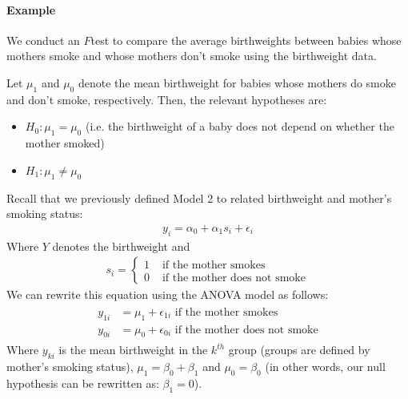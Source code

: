 \documentclass[letterpaper,10pt,english]{jupyterBook}
\begin{document}
\paragraph{Example}
\label{\detokenize{14.g. Linear Regression III:id4}}
\sphinxAtStartPar
We conduct an \(F\)\sphinxhyphen{}test to compare the average birthweights between babies whose mothers smoke and whose mothers don’t smoke using the birthweight data.

\sphinxAtStartPar
Let \(\mu_1\) and \(\mu_0\) denote the mean birthweight for babies whose mothers do smoke and don’t smoke, respectively. Then, the relevant hypotheses are:
\begin{itemize}
\item {} 
\sphinxAtStartPar
\(H_0: \mu_1= \mu_0\) (i.e. the birthweight of a baby does not depend on whether the mother smoked)

\item {} 
\sphinxAtStartPar
\(H_1: \mu_1\neq \mu_0\)

\end{itemize}

\sphinxAtStartPar
Recall that we previously defined Model 2 to related birthweight and mother’s smoking status:
\begin{equation*}
\begin{split} 
y_i = \alpha_0 + \alpha_1 s_i + \epsilon_i
\end{split}
\end{equation*}
\sphinxAtStartPar
Where \(Y\) denotes the birthweight and
\begin{equation*}
\begin{split} 
s_{i} =
\begin{cases}
    1 & \text{ if the mother smokes} \\
    0 & \text{ if the mother does not smoke}
\end{cases} 
\end{split}
\end{equation*}
\sphinxAtStartPar
We can rewrite this equation using the ANOVA model as follows:
\begin{equation*}
\begin{split}
\begin{align}
    y_{1i} &=\mu_1 + \epsilon_{1i}  \text{ if the mother smokes} \\
    y_{0i} &=\mu_0 + \epsilon_{0i}  \text{ if the mother does not smoke}
\end{align} \end{split}
\end{equation*}
\sphinxAtStartPar
Where \(y_{ki}\) is the mean birthweight in the \(k^{th}\) group (groups are defined by mother’s smoking status), \(\mu_1 = \beta_0 + \beta_1\) and \(\mu_0=\beta_0\) (in other words, our null hypothesis can be rewritten as: \(\beta_1=0\)).
\end{document}
